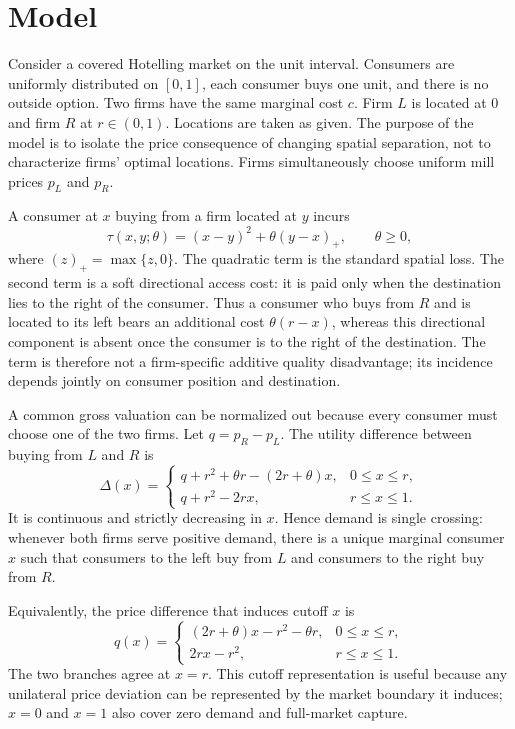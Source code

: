 \section{Model}\label{sec:model}

Consider a covered Hotelling market on the unit interval. Consumers are uniformly distributed on $[0,1]$, each consumer buys one unit, and there is no outside option. Two firms have the same marginal cost $c$. Firm $L$ is located at $0$ and firm $R$ at $r\in(0,1)$. Locations are taken as given. The purpose of the model is to isolate the price consequence of changing spatial separation, not to characterize firms' optimal locations. Firms simultaneously choose uniform mill prices $p_L$ and $p_R$.

A consumer at $x$ buying from a firm located at $y$ incurs
\begin{equation}
\tau(x,y;\theta)=(x-y)^2+\theta (y-x)_+,
\qquad \theta\ge 0,
\label{eq:tau}
\end{equation}
where $(z)_+=\max\{z,0\}$. The quadratic term is the standard spatial loss. The second term is a soft directional access cost: it is paid only when the destination lies to the right of the consumer. Thus a consumer who buys from $R$ and is located to its left bears an additional cost $\theta(r-x)$, whereas this directional component is absent once the consumer is to the right of the destination. The term is therefore not a firm-specific additive quality disadvantage; its incidence depends jointly on consumer position and destination.

A common gross valuation can be normalized out because every consumer must choose one of the two firms. Let $q=p_R-p_L$. The utility difference between buying from $L$ and $R$ is
\begin{equation}
\Delta(x)=
\begin{cases}
q+r^2+\theta r-(2r+\theta)x, & 0\le x\le r,\\
q+r^2-2rx, & r\le x\le 1.
\end{cases}
\label{eq:utilitydifference}
\end{equation}
It is continuous and strictly decreasing in $x$. Hence demand is single crossing: whenever both firms serve positive demand, there is a unique marginal consumer $x$ such that consumers to the left buy from $L$ and consumers to the right buy from $R$.

Equivalently, the price difference that induces cutoff $x$ is
\begin{equation}
q(x)=
\begin{cases}
(2r+\theta)x-r^2-\theta r, & 0\le x\le r,\\
2rx-r^2, & r\le x\le 1.
\end{cases}
\label{eq:qcutoff}
\end{equation}
The two branches agree at $x=r$. This cutoff representation is useful because any unilateral price deviation can be represented by the market boundary it induces; $x=0$ and $x=1$ also cover zero demand and full-market capture.

